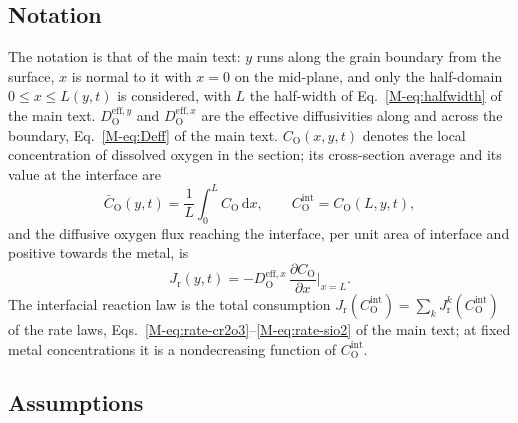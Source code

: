 \documentclass[12pt]{article}
\newcommand{\eff}{\mathrm{eff}}
\newcommand{\intf}{\mathrm{int}}
\newcommand{\Ox}{\mathrm{O}}
\newcommand{\Dx}{D_{\Ox}^{\eff,x}}
\newcommand{\Dy}{D_{\Ox}^{\eff,y}}
\newcommand{\Cb}{\bar{C}_{\Ox}}
\newcommand{\Ci}{C_{\Ox}^{\intf}}
\newcommand{\Jr}{J_{\mathrm{r}}}
\newcommand{\dd}{\mathrm{d}}
\begin{document}
\subsection{Notation}
\label{sec:notation}

The notation is that of the main text: \(y\) runs along the grain boundary
from the surface, \(x\) is normal to it with \(x=0\) on the mid-plane, and only
the half-domain \(0\le x\le L(y,t)\) is considered, with \(L\) the half-width
of Eq.~\eqref{M-eq:halfwidth} of the main text. \(\Dy\) and \(\Dx\) are the
effective diffusivities along and across the boundary,
Eq.~\eqref{M-eq:Deff} of the main text. \(C_{\Ox}(x,y,t)\) denotes the local
concentration of dissolved oxygen in the section; its cross-section average
and its value at the interface are
\begin{equation}
\Cb(y,t)=\frac{1}{L}\int_{0}^{L} C_{\Ox}\,\dd x,\qquad
\Ci=C_{\Ox}(L,y,t),
\label{eq:avg-def}
\end{equation}
and the diffusive oxygen flux reaching the interface, per unit area of
interface and positive towards the metal, is
\begin{equation}
\Jr(y,t)=-\Dx\,\frac{\partial C_{\Ox}}{\partial x}\bigg|_{x=L}.
\label{eq:Jr-def}
\end{equation}
The interfacial reaction law is the total consumption
\(\Jr(\Ci)=\sum_k\Jr^{k}(\Ci)\) of the rate laws,
Eqs.~\eqref{M-eq:rate-cr2o3}--\eqref{M-eq:rate-sio2} of the main text; at
fixed metal concentrations it is a nondecreasing function of \(\Ci\).

\subsection{Assumptions}
\label{sec:assumptions}
\end{document}
